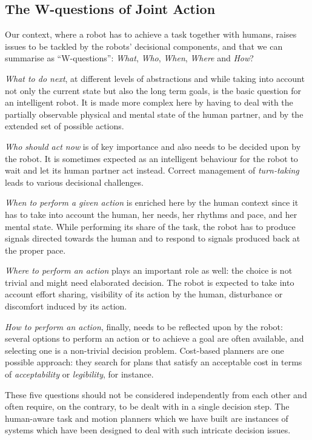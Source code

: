 \documentclass[preprint,3p,times]{elsarticle}
\begin{document}
\subsection{The W-questions of Joint Action}

Our context, where a robot has to achieve a task together with
humans, raises issues to be tackled by the robots' decisional components, and
that we can summarise as ``W-questions'': \emph{What}, \emph{Who}, \emph{When},
\emph{Where} and \emph{How}?

\emph{What to do next}, at different levels of abstractions and while taking
into account not only the current state but also the long term goals, is the
basic question for an intelligent robot. It is made more complex here by having
to deal with the partially observable physical and mental state of the human
partner, and by the extended set of possible actions.

\emph{Who should act now} is of key importance and also needs to be
decided upon by the robot. It is sometimes expected as an intelligent behaviour
for the robot to wait and let its human partner act instead. Correct management
of \emph{turn-taking} leads to various decisional challenges.

\emph{When to perform a given action} is enriched here by the human context
since it has to take into account the human, her needs, her rhythms and
pace, and her mental state. While performing its share of the task, the
robot has to produce signals directed towards the human and to respond to
signals produced back at the proper pace.

\emph{Where to perform an action} plays an important role as well: the choice is
not trivial and might need elaborated decision. The robot is expected to take
into account effort sharing, visibility of its action by the human, disturbance
or discomfort induced by its action.

\emph{How to perform an action}, finally, needs to be reflected upon by the
robot: several options to perform an action or to achieve a goal are often
available, and selecting one is a non-trivial decision problem. Cost-based
planners are one possible approach: they search for plans that satisfy an
acceptable cost in terms of \emph{acceptability} or \emph{legibility}, for
instance.

These five questions should not be considered independently from each other and
often require, on the contrary, to be dealt with in a single decision step. The
human-aware task and motion planners which we have built are instances of
systems which have been designed to deal with such intricate decision issues.
\end{document}
